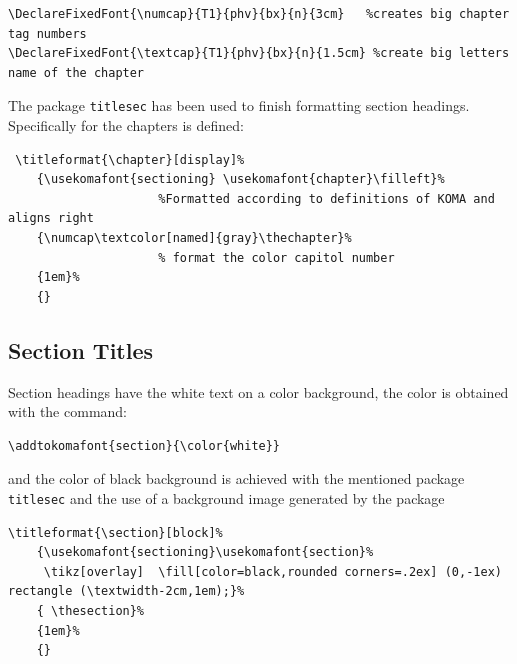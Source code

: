 \documentclass[a4paper,
                             twoside,
                             BCOR=1.0cm,
                             DIV=11,
                             parskip=full,
                             11pt]{scrbook}
\begin{document}
\begin{scriptsize}
    \begin{verbatim}
\DeclareFixedFont{\numcap}{T1}{phv}{bx}{n}{3cm}   %creates big chapter tag numbers
\DeclareFixedFont{\textcap}{T1}{phv}{bx}{n}{1.5cm} %create big letters name of the chapter
\end{verbatim}
\end{scriptsize}
The package \verb+titlesec+ has been used to finish formatting section headings. Specifically for the chapters is defined:
\begin{scriptsize}
    \begin{verbatim}
 \titleformat{\chapter}[display]%              
    {\usekomafont{sectioning} \usekomafont{chapter}\filleft}% 
                     %Formatted according to definitions of KOMA and aligns right
    {\numcap\textcolor[named]{gray}\thechapter}%                   
                     % format the color capitol number
    {1em}%
    {}
\end{verbatim}
\end{scriptsize}

\subsection{Section Titles}\label{sbsec:sectit}
Section headings have the white text on a color background, the color is obtained with the command:
\begin{scriptsize}
    \begin{verbatim}
\addtokomafont{section}{\color{white}}
\end{verbatim}
\end{scriptsize}
and the color of black background is achieved with the mentioned package \verb+titlesec+ and the use of a background image generated by the package
\begin{tiny}
    \begin{verbatim}
\titleformat{\section}[block]%              
    {\usekomafont{sectioning}\usekomafont{section}% 
     \tikz[overlay]  \fill[color=black,rounded corners=.2ex] (0,-1ex) rectangle (\textwidth-2cm,1em);}%  
    { \thesection}%                   
    {1em}%
    {}
\end{verbatim}
\end{tiny}
\end{document}
